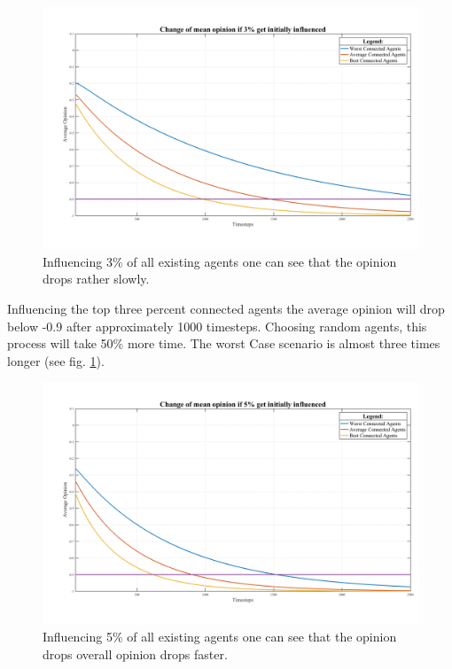 \documentclass[11pt]{article}
\begin{document}
\begin{figure}
	\centering
	\includegraphics[width=\textwidth]{Graphs/3percent.png}
	\caption{Influencing 3\% of all existing agents one can see that the opinion drops rather slowly.}
	\label{fig:plot3}
\end{figure}

Influencing the top three percent connected agents the average opinion will drop below -0.9 after approximately 1000 timesteps. Choosing random agents, this process will take 50\% more time. The worst Case scenario is almost three times longer (see fig. \ref{fig:plot3}).

\begin{figure}
	\centering
	\includegraphics[width=\textwidth]{Graphs/5percent.png}
	\caption{Influencing 5\% of all existing agents one can see that the opinion drops overall opinion drops faster.}
	\label{fig:plot5}
\end{figure}
\end{document}
